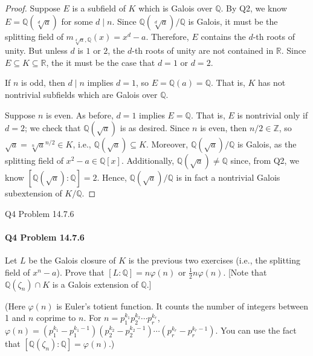 \documentclass[12pt]{article}
\newenvironment{fullbox}{\begin{lrbox}{\savefullbox}\begin{minipage}{\dimexpr\textwidth-2\fboxsep\relax}}{\end{minipage}\end{lrbox}\begin{center}\framebox[\textwidth]{\usebox{\savefullbox}}\end{center}}
\newenvironment{pbox}[1][]{\begin{fullbox}\ifx#1\empty\else\paragraph{#1}\fi}{\end{fullbox}}
\newcommand{\Z}{\mathbb{Z}}
\newcommand{\Q}{\mathbb{Q}}
\newcommand{\R}{\mathbb{R}}
\renewcommand{\phi}{\varphi}
\newcommand{\<}{\langle}
\renewcommand{\>}{\rangle}
\begin{document}
\begin{proof}
    Suppose $E$ is a subfield of $K$ which is Galois over $\Q$. By Q2, we know $E = \Q(\sqrt[d]{a})$ for some $d \mid n$. Since $\Q(\sqrt[d]{a})/\Q$ is Galois, it must be the splitting field of $m_{\sqrt[d]{a}, \Q}(x) = x^d - a$. Therefore, $E$ contains the $d$-th roots of unity. But unless $d$ is $1$ or $2$, the $d$-th roots of unity are not contained in $\R$. Since $E \subseteq K \subseteq \R$, the it must be the case that $d = 1$ or $d = 2$.

    If $n$ is odd, then $d \mid n$ implies $d = 1$, so $E = \Q(a) = \Q$. That is, $K$ has not nontrivial subfields which are Galois over $\Q$.

    Suppose $n$ is even. As before, $d = 1$ implies $E = \Q$. That is, $E$ is nontrivial only if $d = 2$; we check that $\Q(\sqrt{a})$ is as desired. Since $n$ is even, then $n/2 \in \Z$, so $\sqrt{a} = \sqrt[n]{a}^{n/2} \in K$, i.e., $\Q(\sqrt{a}) \subseteq K$. Moreover, $\Q(\sqrt{a})/\Q$ is Galois, as the splitting field of $x^2 - a \in \Q[x]$. Additionally, $\Q(\sqrt{a}) \ne \Q$ since, from Q2, we know $[\Q(\sqrt{a}) : \Q] = 2$. Hence, $\Q(\sqrt{a})/\Q$ is in fact a nontrivial Galois subextension of $K/\Q$.

\end{proof}


\newpage
\begin{pbox}[Q4 Problem 14.7.6]
    Let $L$ be the Galois closure of $K$ is the previous two exercises (i.e., the splitting field of $x^n-a$). Prove that $[L : \Q] = n\phi(n)$ or $\frac{1}{2} n\phi(n)$. [Note that $\Q(\zeta_n)\cap K$ is a Galois extension of $\Q$.]
    
    (Here $\phi(n)$ is Euler's totient function. It counts the number of integers between 1 and $n$ coprime to $n$. For $n = p_1^{k_1} p_2^{k_2} \cdots p_r^{k_r}$, $\phi(n) = (p_1^{k_1} - p_1^{k_1-1})(p_2^{k_2} - p_2^{k_2-1}) \cdots (p_r^{k_r} - p_r^{k_r-1})$. You can use the fact that $[\Q(\zeta_n) : \Q] = \phi(n)$.)
\end{pbox}
\end{document}
